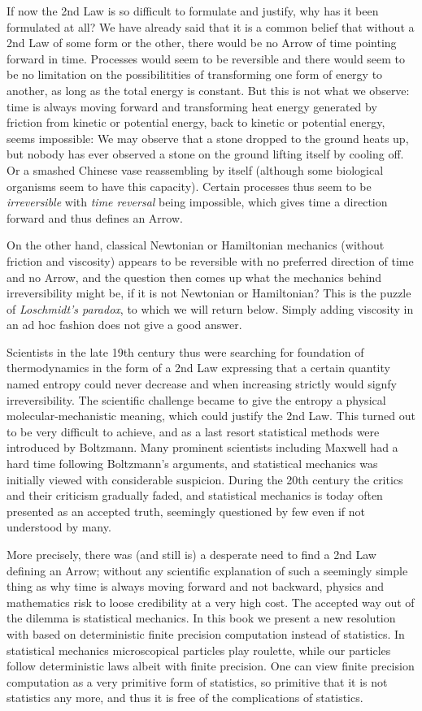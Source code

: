 If now the 2nd Law is so difficult to formulate and justify, why
has it been formulated at all? We have already said that it is a 
common belief that without a 2nd Law of some form or the other,
there would be no Arrow of time pointing
forward in time.  Processes would seem to be reversible
and there would seem to be no limitation on the possibilitities of
transforming one form of energy to another, as long as the total
energy is constant. But this is not what we
observe: time is always moving forward and transforming heat
energy generated by friction from kinetic or potential
energy, back to kinetic or potential energy, seems impossible:
We may observe that a stone dropped to the ground heats up, but nobody
has ever observed a stone on the ground lifting itself by cooling off.
Or a smashed Chinese vase reassembling  by itself
(although some biological organisms seem to have this capacity).
Certain processes thus seem to be \emph{irreversible} with
\emph{time reversal} being impossible,  which gives time a direction 
forward and thus defines an Arrow. 

On the other hand, classical Newtonian or Hamiltonian mechanics 
(without friction and viscosity) appears
to be reversible with no preferred direction of time and no Arrow, 
and the question then comes up what the mechanics behind
irreversibility might be, if it is not Newtonian or Hamiltonian?
This is the puzzle of \emph{Loschmidt's paradox}, to which we will
return below. Simply adding viscosity in an ad hoc fashion does
not give a good answer.

Scientists in the late 19th century thus were
searching for foundation of thermodynamics in the  
form of a 2nd Law expressing that a certain quantity
named entropy could never decrease and when increasing strictly 
would signfy irreversibility. The scientific challenge became
to give the entropy a physical molecular-mechanistic meaning,
which could justify the 2nd Law. This turned out
to be very difficult to achieve, and as a last resort statistical methods
were introduced by Boltzmann. Many prominent scientists including Maxwell
had a hard time following Boltzmann's  arguments,
and statistical mechanics was initially viewed with considerable suspicion.
During the 20th century the critics and their criticism
gradually faded, and statistical mechanics is today often presented 
as an accepted truth, seemingly questioned by few even if 
not understood by many.

More precisely, there was (and still is) a desperate need to find a 
2nd Law defining an Arrow; without any scientific
explanation of such a seemingly simple thing as why time is always moving
forward and not backward, physics and mathematics risk to loose 
credibility at a very high cost. The accepted way out of the dilemma
is statistical mechanics. In this book we present a new resolution
with based on deterministic finite precision computation instead of 
statistics. In statistical mechanics microscopical 
particles play roulette, while our particles follow 
deterministic laws albeit with finite precision. One can 
view finite precision computation as a very primitive
form of statistics, so primitive that it is not statistics any more,
and thus it is free of the complications of statistics. 

